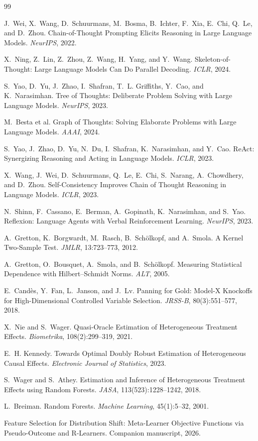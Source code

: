 \documentclass[11pt]{article}
\begin{document}
\begin{thebibliography}{99}
\small

 J.~Wei, X.~Wang, D.~Schuurmans, M.~Bosma, B.~Ichter,
F.~Xia, E.~Chi, Q.~Le, and D.~Zhou. Chain-of-Thought Prompting Elicits Reasoning
in Large Language Models. \emph{NeurIPS}, 2022.

 X.~Ning, Z.~Lin, Z.~Zhou, Z.~Wang, H.~Yang, and Y.~Wang.
Skeleton-of-Thought: Large Language Models Can Do Parallel Decoding.
\emph{ICLR}, 2024.

 S.~Yao, D.~Yu, J.~Zhao, I.~Shafran, T.~L. Griffiths,
Y.~Cao, and K.~Narasimhan. Tree of Thoughts: Deliberate Problem Solving with
Large Language Models. \emph{NeurIPS}, 2023.

 M.~Besta et al. Graph of Thoughts: Solving Elaborate
Problems with Large Language Models. \emph{AAAI}, 2024.

 S.~Yao, J.~Zhao, D.~Yu, N.~Du, I.~Shafran,
K.~Narasimhan, and Y.~Cao. ReAct: Synergizing Reasoning and Acting in Language
Models. \emph{ICLR}, 2023.

 X.~Wang, J.~Wei, D.~Schuurmans, Q.~Le,
E.~Chi, S.~Narang, A.~Chowdhery, and D.~Zhou. Self-Consistency Improves Chain of
Thought Reasoning in Language Models. \emph{ICLR}, 2023.

 N.~Shinn, F.~Cassano, E.~Berman, A.~Gopinath,
K.~Narasimhan, and S.~Yao. Reflexion: Language Agents with Verbal Reinforcement
Learning. \emph{NeurIPS}, 2023.

 A.~Gretton, K.~Borgwardt, M.~Rasch, B.~Sch\"olkopf,
and A.~Smola. A Kernel Two-Sample Test. \emph{JMLR}, 13:723--773, 2012.

 A.~Gretton, O.~Bousquet, A.~Smola, and
B.~Sch\"olkopf. Measuring Statistical Dependence with Hilbert--Schmidt Norms.
\emph{ALT}, 2005.

 E.~Cand\`es, Y.~Fan, L.~Janson, and J.~Lv.
Panning for Gold: Model-X Knockoffs for High-Dimensional Controlled Variable
Selection. \emph{JRSS-B}, 80(3):551--577, 2018.

 X.~Nie and S.~Wager. Quasi-Oracle Estimation of
Heterogeneous Treatment Effects. \emph{Biometrika}, 108(2):299--319, 2021.

 E.~H. Kennedy. Towards Optimal Doubly Robust
Estimation of Heterogeneous Causal Effects. \emph{Electronic Journal of
Statistics}, 2023.

 S.~Wager and S.~Athey. Estimation and Inference
of Heterogeneous Treatment Effects using Random Forests. \emph{JASA},
113(523):1228--1242, 2018.

 L.~Breiman. Random Forests. \emph{Machine Learning},
45(1):5--32, 2001.

 Feature Selection for Distribution Shift: Meta-Learner
Objective Functions via Pseudo-Outcome and R-Learners. Companion manuscript,
2026.

\end{thebibliography}
\end{document}
